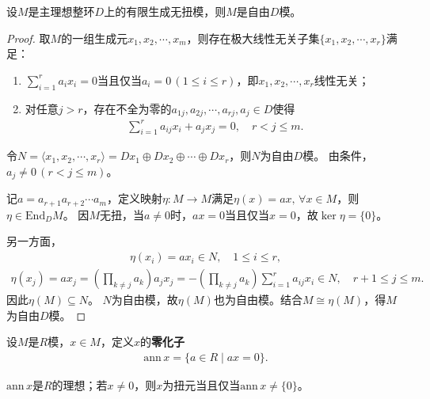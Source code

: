 \documentclass[../../main.tex]{subfiles}%
\begin{document}
\begin{theorem}
设$M$是主理想整环$D$上的有限生成无扭模，则$M$是自由$D$模。
\end{theorem}
\begin{proof}

取$M$的一组生成元$x_1,x_2,\cdots,x_m$，则存在极大线性无关子集$\{x_1,x_2,\cdots,x_r\}$满足：
\begin{enumerate}[(1)]
\item $\sum_{i=1}^{r}a_ix_i=0$当且仅当$a_i=0\,(1\leqslant i\leqslant r)$，即$x_1,x_2,\cdots,x_r$线性无关；
\item 对任意$j>r$，存在不全为零的$a_{1j},a_{2j},\cdots,a_{rj},a_j\in D$使得
\begin{align}\label{eq:5.3.2}
\sum_{i=1}^{r}a_{ij}x_i+a_jx_j=0,\quad r<j\leqslant m.
\end{align}
\end{enumerate}

令$N=\langle x_1,x_2,\cdots,x_r\rangle=Dx_1\oplus Dx_2\oplus\cdots\oplus Dx_r$，则$N$为自由$D$模。
由条件，$a_j\neq0\,(r<j\leqslant m)$。

记$a=a_{r+1}a_{r+2}\cdots a_m$，定义映射$\eta:M\to M$满足$\eta(x)=ax,\,\forall x\in M$，则$\eta\in\mathrm{End}_D M$。
因$M$无扭，当$a\neq0$时，$ax=0$当且仅当$x=0$，故$\ker\eta=\{0\}$。

另一方面，
\begin{align*}
\eta(x_i)=ax_i\in N,\quad 1\leqslant i\leqslant r,
\end{align*}
\begin{align*}
\eta(x_j)=ax_j=\left(\prod_{k\neq j}a_k\right)a_jx_j=-\left(\prod_{k\neq j}a_k\right)\sum_{i=1}^{r}a_{ij}x_i\in N,\quad r+1\leqslant j\leqslant m.
\end{align*}
因此$\eta(M)\subseteq N$。
$N$为自由模，故$\eta(M)$也为自由模。结合$M\cong\eta(M)$，得$M$为自由$D$模。

\end{proof}

\begin{definition}
设$M$是$R$模，$x\in M$，定义$x$的\textbf{零化子}
\begin{align*}
\mathrm{ann}\,x=\{a\in R\mid ax=0\}.
\end{align*}
\end{definition}

\begin{remark}
$\mathrm{ann}\,x$是$R$的理想；若$x\neq0$，则$x$为扭元当且仅当$\mathrm{ann}\,x\neq\{0\}$。
\end{remark}
\end{document}
